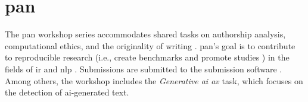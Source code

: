 \section{\acs{pan}}
\label{sec:pan}

The \ac{pan} workshop series accommodates shared tasks %
on authorship analysis, computational ethics, and the originality of writing \cite{ayele_overview_2024}.
\ac{pan}'s goal is to contribute to reproducible research (i.e., create benchmarks and promote studies \cite{kocher_unine_2015}) 
in the fields of \ac{ir} and \ac{nlp} \cite{ayele_overview_2024}.
Submissions are submitted to the submission software \tira{}.
Among others, the workshop includes the \textit{Generative \ac{ai} \ac{av}} task, 
which focuses on the detection of \ac{ai}-generated text.

